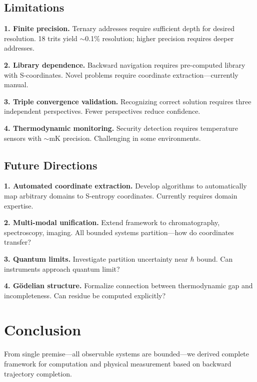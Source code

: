 \documentclass[twocolumn,10pt]{revtex4-2}
\theoremstyle{definition}
\theoremstyle{remark}
\begin{document}
\subsection{Limitations}

\textbf{1. Finite precision.} Ternary addresses require sufficient depth for desired resolution. 18 trits yield $\sim$0.1\% resolution; higher precision requires deeper addresses.

\textbf{2. Library dependence.} Backward navigation requires pre-computed library with S-coordinates. Novel problems require coordinate extraction—currently manual.

\textbf{3. Triple convergence validation.} Recognizing correct solution requires three independent perspectives. Fewer perspectives reduce confidence.

\textbf{4. Thermodynamic monitoring.} Security detection requires temperature sensors with $\sim$mK precision. Challenging in some environments.

\subsection{Future Directions}

\textbf{1. Automated coordinate extraction.} Develop algorithms to automatically map arbitrary domains to S-entropy coordinates. Currently requires domain expertise.

\textbf{2. Multi-modal unification.} Extend framework to chromatography, spectroscopy, imaging. All bounded systems partition—how do coordinates transfer?

\textbf{3. Quantum limits.} Investigate partition uncertainty near $\hbar$ bound. Can instruments approach quantum limit?

\textbf{4. Gödelian structure.} Formalize connection between thermodynamic gap and incompleteness. Can residue be computed explicitly?

\section{Conclusion}
\label{sec:conclusion}

From single premise—all observable systems are bounded—we derived complete framework for computation and physical measurement based on backward trajectory completion.
\end{document}
